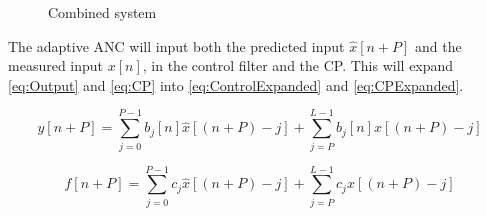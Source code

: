 \begin{figure}[H]
	\centering
	
	\caption{Combined system}
	\label{fig:LPFXLMS}
\end{figure}

The adaptive ANC will input both the predicted input $\hat{x}[n+P]$ and the measured input $x[n]$, in the control filter and the CP. This will expand \autoref{eq:Output} and \autoref{eq:CP} into \autoref{eq:ControlExpanded} and \autoref{eq:CPExpanded}.   

\begin{equation}\label{eq:ControlExpanded}
y[n+P]=\sum^{P-1}_{j=0}b_j[n]\hat{x}[(n+P)-j]+\sum^{L-1}_{j=P}b_j[n]x[(n+P)-j]
\end{equation}

\begin{equation}\label{eq:CPExpanded}
f[n+P]=\sum^{P-1}_{j=0}c_j\hat{x}[(n+P)-j]+\sum^{L-1}_{j=P}c_jx[(n+P)-j]
\end{equation}

